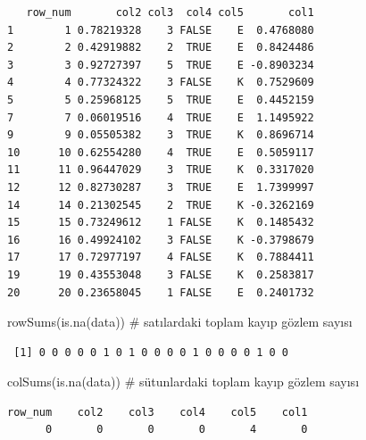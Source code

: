 \documentclass[
  letterpaper,
  DIV=11,
  numbers=noendperiod]{scrreprt}
\newenvironment{Shaded}{\begin{snugshade}}{\end{snugshade}}
\newcommand{\CommentTok}[1]{\textcolor[rgb]{0.37,0.37,0.37}{#1}}
\newcommand{\FunctionTok}[1]{\textcolor[rgb]{0.28,0.35,0.67}{#1}}
\newcommand{\NormalTok}[1]{\textcolor[rgb]{0.00,0.23,0.31}{#1}}
\newcommand{\SpecialCharTok}[1]{\textcolor[rgb]{0.37,0.37,0.37}{#1}}
\begin{document}
\begin{Shaded}
\end{Shaded}

\begin{verbatim}
   row_num       col2 col3  col4 col5       col1
1        1 0.78219328    3 FALSE    E  0.4768080
2        2 0.42919882    2  TRUE    E  0.8424486
3        3 0.92727397    5  TRUE    E -0.8903234
4        4 0.77324322    3 FALSE    K  0.7529609
5        5 0.25968125    5  TRUE    E  0.4452159
7        7 0.06019516    4  TRUE    E  1.1495922
9        9 0.05505382    3  TRUE    K  0.8696714
10      10 0.62554280    4  TRUE    E  0.5059117
11      11 0.96447029    3  TRUE    K  0.3317020
12      12 0.82730287    3  TRUE    E  1.7399997
14      14 0.21302545    2  TRUE    K -0.3262169
15      15 0.73249612    1 FALSE    K  0.1485432
16      16 0.49924102    3 FALSE    K -0.3798679
17      17 0.72977197    4 FALSE    K  0.7884411
19      19 0.43553048    3 FALSE    K  0.2583817
20      20 0.23658045    1 FALSE    E  0.2401732
\end{verbatim}

\begin{Shaded}
\begin{Highlighting}[]
\FunctionTok{rowSums}\NormalTok{(}\FunctionTok{is.na}\NormalTok{(data)) }\CommentTok{\# satılardaki toplam kayıp gözlem sayısı}
\end{Highlighting}
\end{Shaded}

\begin{verbatim}
 [1] 0 0 0 0 0 1 0 1 0 0 0 0 1 0 0 0 0 1 0 0
\end{verbatim}

\begin{Shaded}
\begin{Highlighting}[]
\FunctionTok{colSums}\NormalTok{(}\FunctionTok{is.na}\NormalTok{(data)) }\CommentTok{\# sütunlardaki toplam kayıp gözlem sayısı}
\end{Highlighting}
\end{Shaded}

\begin{verbatim}
row_num    col2    col3    col4    col5    col1 
      0       0       0       0       4       0 
\end{verbatim}
\end{document}
